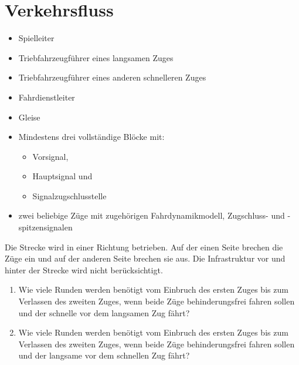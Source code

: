 

\section{Verkehrsfluss}

  \roles
    \begin{itemize}
      \item Spielleiter
      \item Triebfahrzeugführer eines langsamen Zuges
      \item Triebfahrzeugführer eines anderen schnelleren Zuges
      \item Fahrdienstleiter
    \end{itemize}

  \material
    \begin{itemize}
      \item Gleise
      \item Mindestens drei vollständige Blöcke mit:
      \begin{itemize}
        \item Vorsignal,
        \item Hauptsignal und
        \item Signalzugschlusstelle
      \end{itemize}
      \item zwei beliebige Züge mit zugehörigen Fahrdynamikmodell, Zugschluss- und -spitzensignalen
    \end{itemize}

  \setup
    Die Strecke wird in einer Richtung betrieben. Auf der einen Seite brechen die Züge ein und auf der anderen Seite brechen sie aus. Die Infrastruktur vor und hinter der Strecke wird nicht berücksichtigt.

  \task
    \begin{enumerate}[label=\alph*)]
      \item Wie viele Runden werden benötigt vom Einbruch des ersten Zuges bis zum Verlassen des zweiten Zuges, wenn beide Züge behinderungsfrei fahren sollen und der schnelle vor dem langsamen Zug fährt?
      \item Wie viele Runden werden benötigt vom Einbruch des ersten Zuges bis zum Verlassen des zweiten Zuges, wenn beide Züge behinderungsfrei fahren sollen und der langsame vor dem schnellen Zug fährt?
    \end{enumerate}
